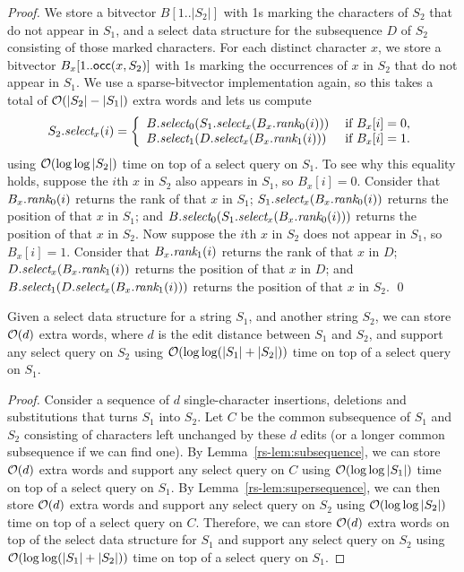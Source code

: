 \begin{proof}
We store a bitvector \(B [1..|S_2|]\) with 1s marking the characters of $S_2$ that do not appear in $S_1$, and a select data structure for the subsequence $D$ of $S_2$ consisting of those marked characters.  For each distinct character $x$, we store a bitvector \(B_x [1..\mathsf{occ} (x, S_2)]\) with 1s marking the occurrences of $x$ in $S_2$ that do not appear in $S_1$.  We use a sparse-bitvector implementation again, so this takes a total of $\mathcal{O}\!\left( |S_2| - |S_1| \right)$ extra words and lets us compute
\[S_2.\select_x (i) =
\left\{ \begin{array}{l@{\hspace{3ex}}l}
B.\select_0 (S_1.\select_x (B_x.\rank_0 (i))) & \mbox{if \(B_x [i] = 0\),}\\
B.\select_1 (D.\select_x (B_x.\rank_1 (i))) & \mbox{if \(B_x [i] = 1\).}
\end{array} \right.\]
using $\mathcal{O}\!\left( \log \log |S_2| \right)$ time on top of a select query on $S_1$.  To see why this equality holds, suppose the $i$th $x$ in $S_2$ also appears in $S_1$, so \(B_x [i] = 0\).  Consider that \(B_x.\textit{rank}_0 (i)\) returns the rank of that $x$ in $S_1$; \(S_1.\textit{select}_x (B_x.\textit{rank}_0 (i))\) returns the position of that $x$ in $S_1$; and \(B.\textit{select}_0 (S_1.\textit{select}_x (B_x.\textit{rank}_0 (i)))\) returns the position of that $x$ in $S_2$.  Now suppose the $i$th $x$ in $S_2$ does not appear in $S_1$, so \(B_x [i] = 1\).  Consider that \(B_x.\textit{rank}_1 (i)\) returns the rank of that $x$ in $D$; \(D.\textit{select}_x (B_x.\textit{rank}_1 (i))\) returns the position of that $x$ in $D$; and \(B.\textit{select}_1 (D.\textit{select}_x (B_x.\textit{rank}_1 (i)))\) returns the position of that $x$ in $S_2$.
\qed
\end{proof}

\begin{theorem}
\label{rs-thm:main}
Given a select data structure for a string $S_1$, and another string $S_2$, we can store $\mathcal{O}\!\left( d \right)$ extra words, where $d$ is the edit distance between $S_1$ and $S_2$, and support any select query on $S_2$ using $\mathcal{O}\!\left( \log \log (|S_1| + |S_2|) \right)$ time on top of a select query on $S_1$.
\end{theorem}

\begin{proof}
Consider a sequence of $d$ single-character insertions, deletions and substitutions that turns $S_1$ into $S_2$.  Let $C$ be the common subsequence of $S_1$ and $S_2$ consisting of characters left unchanged by these $d$ edits (or a longer common subsequence if we can find one).  By Lemma~\ref{rs-lem:subsequence}, we can store $\mathcal{O}\!\left( d \right)$ extra words and support any select query on $C$ using $\mathcal{O}\!\left( \log \log |S_1| \right)$ time on top of a select query on $S_1$.  By Lemma~\ref{rs-lem:supersequence}, we can then store $\mathcal{O}\!\left( d \right)$ extra words and support any select query on $S_2$ using $\mathcal{O}\!\left( \log \log |S_2| \right)$ time on top of a select query on $C$.  Therefore, we can store $\mathcal{O}\!\left( d \right)$ extra words on top of the select data structure for $S_1$ and support any select query on $S_2$ using $\mathcal{O}\!\left( \log \log (|S_1| + |S_2|) \right)$ time on top of a select query on $S_1$.
\end{proof}

